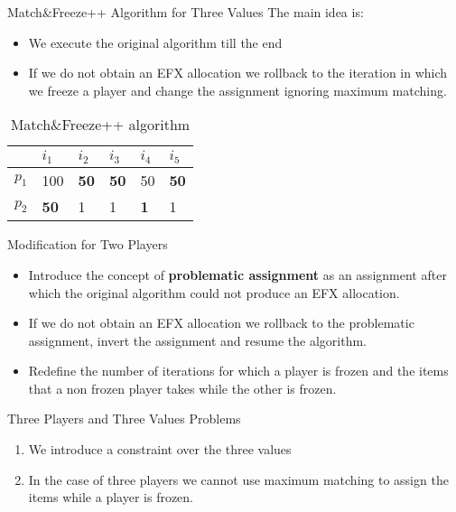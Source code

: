 \begin{frame}{Match\&Freeze++ Algorithm for Three Values}
The main idea is:
\begin{itemize}
    \item We execute the original algorithm till the end
    \item If we do not obtain an EFX allocation we rollback to the iteration in which we freeze a player and change the assignment ignoring maximum matching.
\end{itemize}
\begin{table}[h]
\centering
\begin{tabular}{|l|l|l|l|l|l|}
\hline
      & $i_1$ & $i_2$ & $i_3$ & $i_4$ & $i_5$ \\ \hline
$p_1$ & 100   & \textbf{50}   & \textbf{50}   & 50   & \textbf{50}   \\ \hline
$p_2$ & \textbf{50}   & 1   & 1   & \textbf{1}   & 1   \\ \hline
\end{tabular}
\caption{Match\&Freeze++ algorithm}
\label{table:counter-example-match-and-freeze-three-values-fixed}
\end{table}
\end{frame}

\begin{frame}{Modification for Two Players}
 \begin{itemize}
        \item Introduce the concept of \textbf{problematic assignment} as an assignment after which the original algorithm could not produce an EFX allocation.
        \item If we do not obtain an EFX allocation we rollback to the problematic assignment, invert the assignment and resume the algorithm.
        \item Redefine the number of iterations for which a player is frozen and the items that a non frozen player takes while the other is frozen.
        
    \end{itemize}
\end{frame}

\begin{frame}{Three Players and Three Values Problems}
    \begin{enumerate}
        \item We introduce a constraint over the three values
        \item In the case of three players we cannot use maximum matching to assign the items while a player is frozen. 
    \end{enumerate}
\end{frame}

